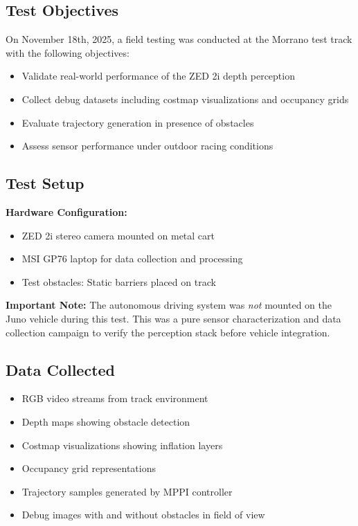 \subsection{Test Objectives}
On November 18th, 2025, a field testing  was conducted at the Morrano test track with the following objectives:
\begin{itemize}
    \item Validate real-world performance of the ZED 2i depth perception
    \item Collect debug datasets including costmap visualizations and occupancy grids
    \item Evaluate trajectory generation in presence of obstacles
    \item Assess sensor performance under outdoor racing conditions
\end{itemize}

\subsection{Test Setup}
\textbf{Hardware Configuration:}
\begin{itemize}
    \item ZED 2i stereo camera mounted on metal cart
    \item MSI GP76 laptop for data collection and processing
    \item Test obstacles: Static barriers placed on track
\end{itemize}

\textbf{Important Note:} The autonomous driving system was \textit{not} mounted on the Juno vehicle during this test. This was a pure sensor characterization and data collection campaign to verify the perception stack before vehicle integration.

\subsection{Data Collected}
\begin{itemize}
    \item RGB video streams from track environment
    \item Depth maps showing obstacle detection
    \item Costmap visualizations showing inflation layers
    \item Occupancy grid representations
    \item Trajectory samples generated by MPPI controller
    \item Debug images with and without obstacles in field of view
\end{itemize}

